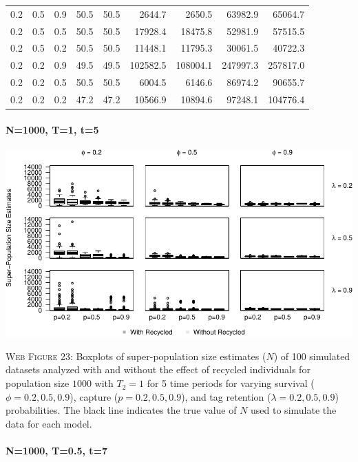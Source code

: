 \documentclass[]{article}
\let\oldparagraph\paragraph
\renewcommand{\paragraph}[1]{\oldparagraph{#1}\mbox{}}
\begin{document}
\begin{table}[ht]
{\begin{tabular}{rrrrrrrrr}
  0.2 & 0.5 & 0.9 & 50.5 & 50.5 & 2644.7 & 2650.5 & 63982.9 & 65064.7 \\ 
  0.2 & 0.5 & 0.5 & 50.5 & 50.5 & 17928.4 & 18475.8 & 52981.9 & 57515.5 \\ 
  0.2 & 0.5 & 0.2 & 50.5 & 50.5 & 11448.1 & 11795.3 & 30061.5 & 40722.3 \\ 
  0.2 & 0.2 & 0.9 & 49.5 & 49.5 & 102582.5 & 108004.1 & 247997.3 & 257817.0 \\ 
  0.2 & 0.2 & 0.5 & 50.5 & 50.5 & 6004.5 & 6146.6 & 86974.2 & 90655.7 \\ 
  0.2 & 0.2 & 0.2 & 47.2 & 47.2 & 10566.9 & 10894.6 & 97248.1 & 104776.4 \\ 
   \hline
\end{tabular}
}
\endgroup
\end{table}

\newpage

\paragraph{N=1000, T=1, t=5}\label{n1000-t1-t5-3}

\includegraphics{Appendix_BW_files/figure-latex/figure23_superN_GJSTL5-1.pdf}

\textsc{Web Figure 23:} Boxplots of super-population size estimates
(\(N\)) of 100 simulated datasets analyzed with and without the effect
of recycled individuals for population size \(1000\) with \(T_2=1\) for
5 time periods for varying survival (\(\phi=0.2,0.5,0.9\)), capture
(\(p=0.2,0.5,0.9\)), and tag retention (\(\lambda=0.2,0.5,0.9\))
probabilities. The black line indicates the true value of \(N\) used to
simulate the data for each model.

\paragraph{N=1000, T=0.5, t=7}\label{n1000-t0.5-t7}
\end{document}
